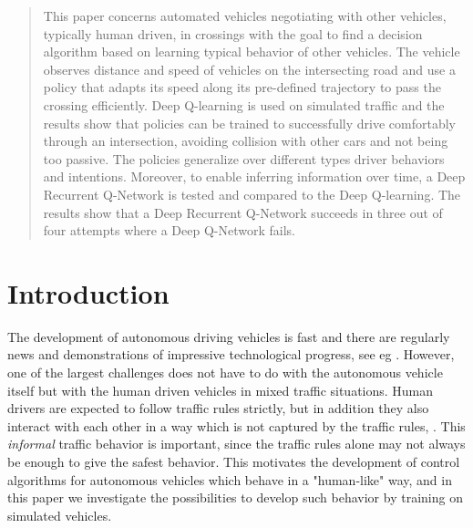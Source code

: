 
\newcommand {\matr}[2]{\left[\begin{array}{#1}#2\end{array}\right]}
\newcommand{\E}{\mathbb{E}}
\newcommand{\tr}{\mathrm{tr}}
\newcommand{\x}{{\mathbf{x}}}
\renewcommand{\u}{{\mathbf{u}}}
\newcommand{\w}{{\mathbf{w}}}
\renewcommand{\r}{{\mathbf{r}}}

\begin{abstract}
This paper concerns automated vehicles negotiating with other vehicles, typically human driven, in crossings with the goal to find a decision algorithm based on learning typical behavior of other vehicles. The vehicle observes distance and speed of vehicles on the intersecting road and use a policy that adapts its speed along its pre-defined trajectory to pass the crossing efficiently.
Deep Q-learning is used on simulated traffic and the results show that policies can be trained to successfully drive comfortably through an intersection, avoiding collision with other cars and not being too passive. The policies generalize over different types driver behaviors and intentions.
Moreover, to enable inferring information over time, a Deep Recurrent Q-Network is tested and compared to the Deep Q-learning. The results show that a Deep Recurrent Q-Network succeeds in three out of four attempts where a Deep Q-Network fails.

\end{abstract}

\section{Introduction}
The development of autonomous driving vehicles is fast and there are regularly news and demonstrations of impressive technological progress, see eg \cite{Bojarski2016EndCars}. However, one of the largest challenges does not have to do with the autonomous vehicle itself but with the human driven vehicles in mixed traffic situations. Human drivers are expected to follow traffic rules strictly, but in addition they also interact with each other in a way which is not captured by the traffic rules,  \cite{Liebner2012DriverModel, Lefevre2012EvaluatingIntentions}. This {\em informal} traffic behavior is important, since the traffic rules alone may not always be enough to give the safest behavior. This motivates the development of control algorithms for autonomous vehicles which behave in a "human-like" way, and in this paper we investigate the possibilities to develop such behavior by training on simulated vehicles. 

